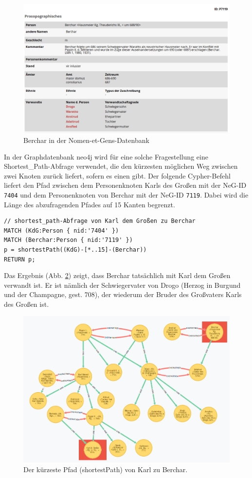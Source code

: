 \documentclass[ngerman,]{scrreprt}
\begin{document}
\begin{figure}
\centering
\includegraphics{Bilder/NeG/040-Berchar-DB-Eintrag.jpg}
\caption{Berchar in der Nomen-et-Gens-Datenbank}
\label{berchar}
\end{figure}

In der Graphdatenbank neo4j wird für eine solche Fragestellung eine Shortest\_Path-Abfrage verwendet, die den kürzesten möglichen Weg zwischen zwei Knoten zurück liefert, sofern es einen gibt. Der folgende Cypher-Befehl liefert den Pfad zwischen dem Personenknoten Karls des Großen mit der NeG-ID \texttt{7404} und dem Personenknoten von Berchar mit der NeG-ID \texttt{7119}. Dabei wird die Länge des abzufragenden Pfades auf 15 Kanten begrenzt.

\begin{verbatim}
// shortest_path-Abfrage von Karl dem Großen zu Berchar
MATCH (KdG:Person { nid:'7404' })
MATCH (Berchar:Person { nid:'7119' })
p = shortestPath((KdG)-[*..15]-(Berchar))
RETURN p;
\end{verbatim}

Das Ergebnis (Abb. \ref{shortestpath}) zeigt, dass Berchar tatsächlich mit Karl dem Großen verwandt ist. Er ist nämlich der Schwiegervater von Drogo (Herzog in Burgund und der Champagne, gest. 708), der wiederum der Bruder des Großvaters Karls des Großen ist.

\begin{figure}
\centering
\includegraphics{Bilder/NeG/050-Berchar-Karl-shortestpath.jpg}
\caption{Der kürzeste Pfad (shortestPath) von Karl zu Berchar.}
\label{shortestpath}
\end{figure}
\end{document}
